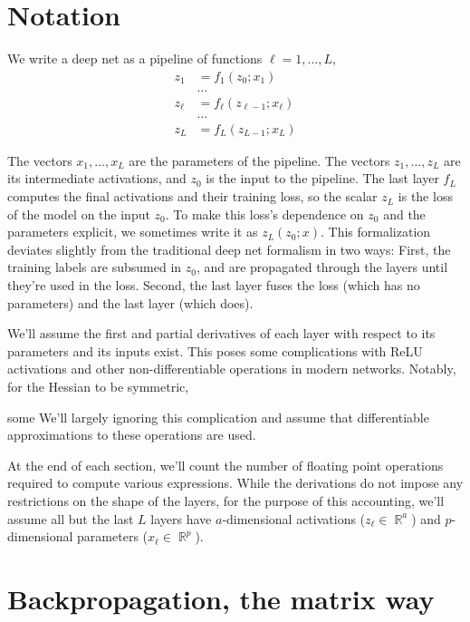 \documentclass{article}
\newcommand{\R}{\mathop{\mathbb{R}}}
\begin{document}
\section{Notation}

We write a deep net as a pipeline of functions $\ell = 1, \ldots, L$,
\begin{align}
    z_1    & = f_1(z_0; x_1) \nonumber              \\
    & \ldots \nonumber                       \\
    z_\ell & = f_\ell(z_{\ell-1}; x_\ell) \nonumber \\
    & \ldots \nonumber                       \\
    z_L    & = f_L(z_{L-1}; x_L)
\end{align}

The vectors $x_1,\ldots, x_L$ are the parameters of the pipeline. The vectors $z_1,\ldots, z_L$ are its intermediate
activations, and $z_0$ is the input to the pipeline. The last layer $f_L$ computes the final activations and their
training loss, so the scalar $z_L$ is the loss of the model on the input $z_0$. To make this loss's dependence on $z_0$
and the parameters explicit, we sometimes write it as $z_L(z_0;x)$. This formalization deviates slightly from the
traditional deep net formalism in two ways: First, the training labels are subsumed in $z_0$, and are propagated
through the layers until they're used in the loss. Second, the last layer fuses the loss (which has no parameters) and
the last layer (which does).

We'll assume the first and partial derivatives of each layer with respect to its parameters and its inputs exist. This
poses some complications with ReLU activations and other non-differentiable operations in modern networks. Notably, for
the Hessian to be symmetric,

some We'll largely ignoring this complication and assume that differentiable approximations to these operations are
used.

At the end of each section, we'll count the number of floating point operations required to compute various
expressions. While the derivations do not impose any restrictions on the shape of the layers, for the purpose of this
accounting, we'll assume all but the last $L$ layers have $a$-dimensional activations ($z_\ell \in \R^a$) and
$p$-dimensional parameters ($x_\ell \in \R^p$).

\section{Backpropagation, the matrix way}
\end{document}

